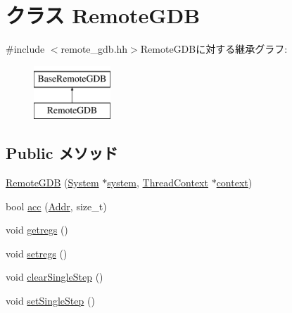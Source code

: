 \hypertarget{classPowerISA_1_1RemoteGDB}{
\section{クラス RemoteGDB}
\label{classPowerISA_1_1RemoteGDB}
}


{\ttfamily \#include $<$remote\_\-gdb.hh$>$}RemoteGDBに対する継承グラフ:\begin{figure}[H]
\begin{center}
\leavevmode
\includegraphics[height=2cm]{classPowerISA_1_1RemoteGDB}
\end{center}
\end{figure}
\subsection*{Public メソッド}
\begin{DoxyCompactItemize}
\item 
\hyperlink{classPowerISA_1_1RemoteGDB_a7d97c5a4edd8630299b2b0521ae32d98}{RemoteGDB} (\hyperlink{classSystem}{System} $\ast$\hyperlink{classBaseRemoteGDB_af27ccd765f13a4b7bd119dc7579e2746}{system}, \hyperlink{classThreadContext}{ThreadContext} $\ast$\hyperlink{classBaseRemoteGDB_a9684dd9218c7836517670f8a0d8f3df7}{context})
\item 
bool \hyperlink{classPowerISA_1_1RemoteGDB_a07d679884d7893090266b44c9a1520cb}{acc} (\hyperlink{base_2types_8hh_af1bb03d6a4ee096394a6749f0a169232}{Addr}, size\_\-t)
\item 
void \hyperlink{classPowerISA_1_1RemoteGDB_a62bc8adc5a48f1cbb5eb9bb64301d38d}{getregs} ()
\item 
void \hyperlink{classPowerISA_1_1RemoteGDB_a2051121b6bc93c8ca3856bbeeca7bdc1}{setregs} ()
\item 
void \hyperlink{classPowerISA_1_1RemoteGDB_afd89268069d9026378b06b08c97f65f8}{clearSingleStep} ()
\item 
void \hyperlink{classPowerISA_1_1RemoteGDB_a40d5da340fdb741de8cd3ffbc69708fe}{setSingleStep} ()
\end{DoxyCompactItemize}


